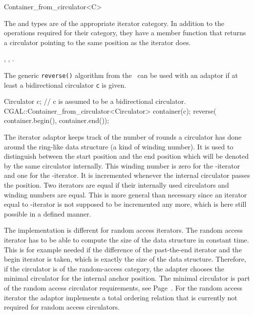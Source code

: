 \begin{ccRefClass}{Container_from_circulator<C>}
\ccGlue
{}
\ccGlue
{}
\ccGlue
{}
\def\ccTagRmTrailingConst{\ccTrue}

The  and  types are of the
appropriate iterator category. In addition to the operations required
for their category, they have a member function
 that returns a circulator pointing to the
same position as the iterator does.

\ccSeeAlso

, 
,
.

\ccExample

The generic {\tt reverse()} algorithm from the \stl\ can be used with an
adaptor if at least a bidirectional circulator {\tt c} is given.

\begin{ccExampleCode}
Circulator c;  // c is assumed to be a bidirectional circulator.
CGAL::Container_from_circulator<Circulator> container(c);
reverse( container.begin(), container.end());
\end{ccExampleCode}

\ccImplementation

The iterator adaptor keeps track of the number of rounds a circulator
has done around the ring-like data structure (a kind of winding
number). It is used to distinguish between the start position and the
end position which will be denoted by the same circulator internally.
This winding number is zero for the -iterator and one
for the -iterator.  It is incremented whenever the
internal circulator passes the  position. Two
iterators are equal if their internally used circulators and winding
numbers are equal. 
This is more general than necessary since an iterator equal to
-iterator is not supposed to be incremented 
 any more, which is here still possible in a defined manner. 

The implementation is different for random access iterators.
The random access iterator has to be able to compute the size of the
data structure in constant time. This is for example needed if the
difference of the past-the-end iterator and the begin iterator is
taken, which is exactly the  size of the data structure.
Therefore, if the circulator is of the random-access category, the
adapter chooses the minimal circulator for the internal anchor
position. The minimal circulator is part of the random access
circulator requirements, see
Page~\pageref{sectionMinCircleRequ}.  For the random
access iterator the adaptor implements a total ordering relation that
is currently not required for random access circulators.

\end{ccRefClass}

